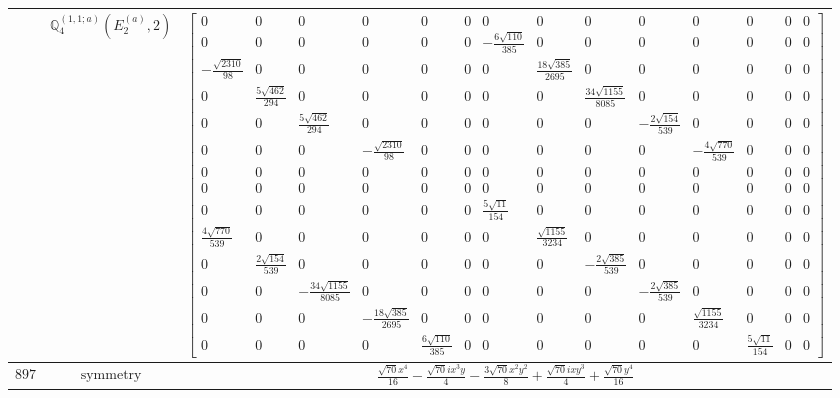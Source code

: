 \documentclass[fleqn,8pt,landscape]{jsarticle}
\begin{document}
\begin{longtable}{ccc}
$  $ & $ \mathbb{Q}_{4}^{(1,1;a)}(E_{2}^{(a)},2) $ & $ \begin{bmatrix} 0 & 0 & 0 & 0 & 0 & 0 & 0 & 0 & 0 & 0 & 0 & 0 & 0 & 0 \\ 0 & 0 & 0 & 0 & 0 & 0 & - \frac{6 \sqrt{110}}{385} & 0 & 0 & 0 & 0 & 0 & 0 & 0 \\ - \frac{\sqrt{2310}}{98} & 0 & 0 & 0 & 0 & 0 & 0 & \frac{18 \sqrt{385}}{2695} & 0 & 0 & 0 & 0 & 0 & 0 \\ 0 & \frac{5 \sqrt{462}}{294} & 0 & 0 & 0 & 0 & 0 & 0 & \frac{34 \sqrt{1155}}{8085} & 0 & 0 & 0 & 0 & 0 \\ 0 & 0 & \frac{5 \sqrt{462}}{294} & 0 & 0 & 0 & 0 & 0 & 0 & - \frac{2 \sqrt{154}}{539} & 0 & 0 & 0 & 0 \\ 0 & 0 & 0 & - \frac{\sqrt{2310}}{98} & 0 & 0 & 0 & 0 & 0 & 0 & - \frac{4 \sqrt{770}}{539} & 0 & 0 & 0 \\ 0 & 0 & 0 & 0 & 0 & 0 & 0 & 0 & 0 & 0 & 0 & 0 & 0 & 0 \\ 0 & 0 & 0 & 0 & 0 & 0 & 0 & 0 & 0 & 0 & 0 & 0 & 0 & 0 \\ 0 & 0 & 0 & 0 & 0 & 0 & \frac{5 \sqrt{11}}{154} & 0 & 0 & 0 & 0 & 0 & 0 & 0 \\ \frac{4 \sqrt{770}}{539} & 0 & 0 & 0 & 0 & 0 & 0 & \frac{\sqrt{1155}}{3234} & 0 & 0 & 0 & 0 & 0 & 0 \\ 0 & \frac{2 \sqrt{154}}{539} & 0 & 0 & 0 & 0 & 0 & 0 & - \frac{2 \sqrt{385}}{539} & 0 & 0 & 0 & 0 & 0 \\ 0 & 0 & - \frac{34 \sqrt{1155}}{8085} & 0 & 0 & 0 & 0 & 0 & 0 & - \frac{2 \sqrt{385}}{539} & 0 & 0 & 0 & 0 \\ 0 & 0 & 0 & - \frac{18 \sqrt{385}}{2695} & 0 & 0 & 0 & 0 & 0 & 0 & \frac{\sqrt{1155}}{3234} & 0 & 0 & 0 \\ 0 & 0 & 0 & 0 & \frac{6 \sqrt{110}}{385} & 0 & 0 & 0 & 0 & 0 & 0 & \frac{5 \sqrt{11}}{154} & 0 & 0 \end{bmatrix} $ \\ \hline
$ 897 $ & $ \text{symmetry} $ & $ \frac{\sqrt{70} x^{4}}{16} - \frac{\sqrt{70} i x^{3} y}{4} - \frac{3 \sqrt{70} x^{2} y^{2}}{8} + \frac{\sqrt{70} i x y^{3}}{4} + \frac{\sqrt{70} y^{4}}{16} $ \\

\end{longtable}
\end{document}
